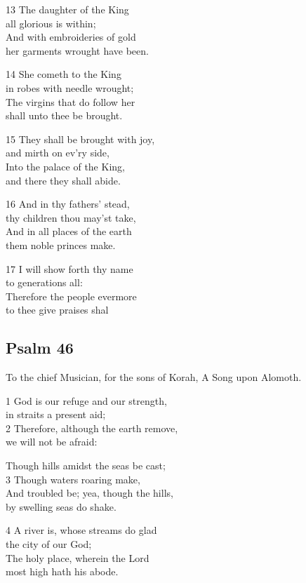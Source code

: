 13 The daughter of the King\\
all glorious is within;\\
And with embroideries of gold\\
her garments wrought have been.

14 She cometh to the King\\
in robes with needle wrought;\\
The virgins that do follow her\\
shall unto thee be brought.

15 They shall be brought with joy,\\
and mirth on ev’ry side,\\
Into the palace of the King,\\
and there they shall abide.

16 And in thy fathers’ stead,\\
thy children thou may’st take,\\
And in all places of the earth\\
them noble princes make.

17 I will show forth thy name\\
to generations all:\\
Therefore the people evermore\\
to thee give praises shal

\begin{center}
\quad{}\quad{}
\end{center}

\subsection*{Psalm 46}

To the chief Musician, for the sons of Korah,
A Song upon Alomoth.

1 God is our refuge and our strength,\\
in straits a present aid;\\
2 Therefore, although the earth remove,\\
we will not be afraid:

Though hills amidst the seas be cast;\\
3 Though waters roaring make,\\
And troubled be; yea, though the hills,\\
by swelling seas do shake.

4 A river is, whose streams do glad\\
the city of our God;\\
The holy place, wherein the Lord\\
most high hath his abode.


